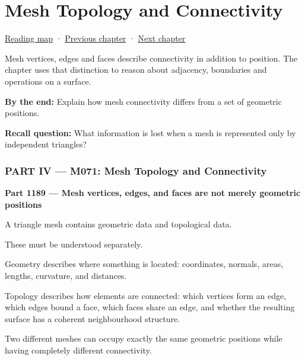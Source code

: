 \chapter{Mesh Topology and Connectivity}\label{04-visual-computing-ii-ch023-mesh-topology-and-connectivity}\hypertarget{04-visual-computing-ii-ch023}{}\label{stagechapter:04-visual-computing-ii-ch023}

\hypertarget{04-visual-computing-ii-ch023-mesh-topology-and-connectivity}{}

\hyperref[volume-reading-map]{Reading map} · \hyperref[04-visual-computing-ii-ch022-convex-support-mapping-and-distance]{Previous chapter} · \hyperref[04-visual-computing-ii-ch024-raytriangle-intersection]{Next chapter}

Mesh vertices, edges and faces describe connectivity in addition to position. The chapter uses that distinction to reason about adjacency, boundaries and operations on a surface.

\textbf{By the end:} Explain how mesh connectivity differs from a set of geometric positions.

\textbf{Recall question:} What information is lost when a mesh is represented only by independent triangles?

\subsection{PART IV --- M071: Mesh Topology and Connectivity}\label{04-visual-computing-ii-ch023-part-iv-m071-mesh-topology-and-connectivity}

\hypertarget{04-visual-computing-ii-ch023-part-iv-m071-mesh-topology-and-connectivity}{}

\textbf{Part 1189 --- Mesh vertices, edges, and faces are not merely geometric positions}

A triangle mesh contains geometric data and topological data.

These must be understood separately.

Geometry describes where something is located: coordinates, normals, areas, lengths, curvature, and distances.

Topology describes how elements are connected: which vertices form an edge, which edges bound a face, which faces share an edge, and whether the resulting surface has a coherent neighbourhood structure.

Two different meshes can occupy exactly the same geometric positions while having completely different connectivity.

